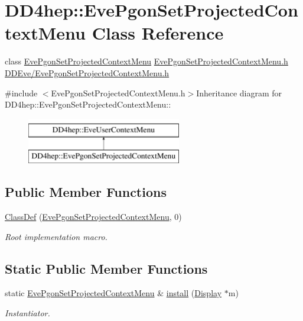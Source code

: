 \hypertarget{class_d_d4hep_1_1_eve_pgon_set_projected_context_menu}{
\section{DD4hep::EvePgonSetProjectedContextMenu Class Reference}
\label{class_d_d4hep_1_1_eve_pgon_set_projected_context_menu}
}


class \hyperlink{class_d_d4hep_1_1_eve_pgon_set_projected_context_menu}{EvePgonSetProjectedContextMenu} \hyperlink{_eve_pgon_set_projected_context_menu_8h}{EvePgonSetProjectedContextMenu.h} \hyperlink{_eve_pgon_set_projected_context_menu_8h}{DDEve/EvePgonSetProjectedContextMenu.h}  


{\ttfamily \#include $<$EvePgonSetProjectedContextMenu.h$>$}Inheritance diagram for DD4hep::EvePgonSetProjectedContextMenu::\begin{figure}[H]
\begin{center}
\leavevmode
\includegraphics[height=2cm]{class_d_d4hep_1_1_eve_pgon_set_projected_context_menu}
\end{center}
\end{figure}
\subsection*{Public Member Functions}
\begin{DoxyCompactItemize}
\item 
\hyperlink{class_d_d4hep_1_1_eve_pgon_set_projected_context_menu_aea367eff04cd968f43590dd69a718ffb}{ClassDef} (\hyperlink{class_d_d4hep_1_1_eve_pgon_set_projected_context_menu}{EvePgonSetProjectedContextMenu}, 0)
\begin{DoxyCompactList}\small\item\em Root implementation macro. \item\end{DoxyCompactList}\end{DoxyCompactItemize}
\subsection*{Static Public Member Functions}
\begin{DoxyCompactItemize}
\item 
static \hyperlink{class_d_d4hep_1_1_eve_pgon_set_projected_context_menu}{EvePgonSetProjectedContextMenu} \& \hyperlink{class_d_d4hep_1_1_eve_pgon_set_projected_context_menu_a1704c29806f07b92caf26bee83b69722}{install} (\hyperlink{class_d_d4hep_1_1_display}{Display} $\ast$m)
\begin{DoxyCompactList}\small\item\em Instantiator. \item\end{DoxyCompactList}\end{DoxyCompactItemize}
